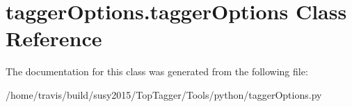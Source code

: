 \hypertarget{classtaggerOptions_1_1taggerOptions}{\section{tagger\-Options.\-tagger\-Options Class Reference}
\label{classtaggerOptions_1_1taggerOptions}
}


The documentation for this class was generated from the following file\-:\begin{DoxyCompactItemize}
\item 
/home/travis/build/susy2015/\-Top\-Tagger/\-Tools/python/tagger\-Options.\-py\end{DoxyCompactItemize}
